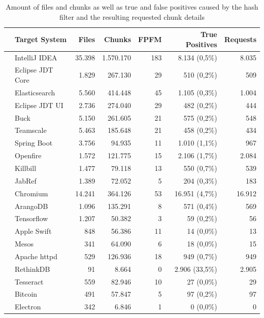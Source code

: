 \begin{table}[ht]
	\centering
	\begin{tabular}{l|lrrrrr}
		 & \textbf{Target System} & \textbf{Files} & \textbf{Chunks} & \textbf{FPFM} & \textbf{True Positives} & \textbf{Requests} \\ 
		\hline 
		\parbox[t]{2mm}{} 
		& IntelliJ IDEA & 35.398 & 1.570.170 & 183 & 8.134 (0,5\%) & 8.035 \\
		& Eclipse JDT Core & 1.829 & 267.130 & 29 & 510 (0,2\%) & 509 \\
		& Elasticsearch & 5.560 & 414.448 & 45 & 1.105 (0,3\%) & 1.004 \\
		& Eclipse JDT UI & 2.736 & 274.040 & 29 & 482 (0,2\%) & 444 \\
		& Buck & 5.150 & 261.605 & 21 & 575 (0,2\%) & 548 \\
		& Teamscale & 5.463 & 185.648 & 21 & 458 (0,2\%) & 434 \\
		& Spring Boot & 3.756 & 94.935 & 11 & 1.010 (1,1\%) & 967 \\
		& Openfire & 1.572 & 121.775 & 15 & 2.106 (1,7\%) & 2.084 \\
		& Killbill & 1.477 & 79.118 & 13 & 550 (0,7\%) & 539 \\
		& JabRef & 1.389 & 72.052 & 5 & 204 (0,3\%) & 183 \\
		\hline 
		\parbox[t]{2mm}{} 
		& Chromium & 14.241 & 364.126 & 53 & 16.951 (4,7\%) & 16.912 \\
		& ArangoDB & 1.096 & 135.291 & 8 & 571 (0,4\%) & 569 \\
		& Tensorflow & 1.207 & 50.382 & 3 & 59 (0,2\%) & 56 \\
		& Apple Swift & 848 & 56.386 & 11 & 14 (0,0\%) & 13 \\
		& Mesos & 341 & 64.090 & 6 & 18 (0,0\%) & 15 \\
		& Apache httpd & 529 & 126.936 & 18 & 949 (0,7\%) & 949 \\
		& RethinkDB & 91 & 8.664 & 0 & 2.906 (33,5\%) & 2.905 \\
		& Tesseract & 559 & 82.946 & 10 & 27 (0,0\%) & 29 \\
		& Bitcoin & 491 & 57.847 & 5 & 97 (0,2\%) & 97 \\
		& Electron & 342 & 6.846 & 1 & 0 (0,0\%) & 0 \\
	\end{tabular}
	\caption{Amount of files and chunks as well as true and false positives caused by the hash filter and the resulting requested chunk details}\label{table:unfiltered_findings}
\end{table}

